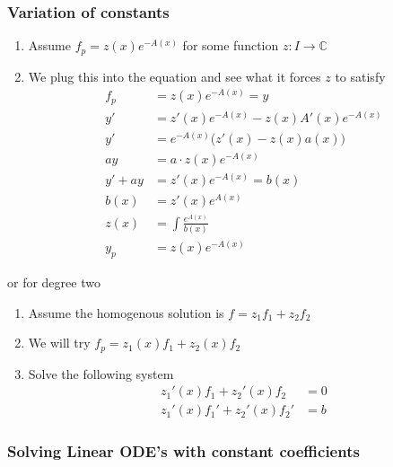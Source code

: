 \documentclass[8pt]{extarticle}
\newcommand{\C}{{\mathbb C}}
\newcommand{\ra}{{\rightarrow}}
\begin{document}
\begin{multicols*}{3}
    \subsubsection {Variation of constants}
  
  \begin{enumerate}[label=(\arabic*)]
    \item Assume $f_p = z(x) e^{-A(x)}$ for some function
          $z: I \ra \C$
    \item We plug this into the equation and see what
          it forces $z$ to satisfy
          \begin{align*}
            f_p     & = z(x) e^{-A(x)} = y                      \\
            y'      & = z'(x) e^{-A(x)} - z(x) A'(x) e^{-A(x)}  \\
            y'      & = e^{-A(x)} \Big (z'(x) - z(x) a(x)\Big ) \\
            ay      & = a \cdot z(x) e^{-A(x)}                  \\
            y' + ay & = z'(x) e^{-A(x)} = b(x)                  \\
            b(x)    & = z'(x) e^{A(x)}                          \\
            z(x)    & = \int \frac{e^{A(x)}}{b(x)}              \\
            y_p     & = z(x) e^{-A(x)}
          \end{align*}
  \end{enumerate}
  or for degree two
  \begin{enumerate}[label=(\arabic*)]
    \item Assume the homogenous solution is $f = z_1 f_1 + z_2 f_2$
    \item We will try $f_p = z_1(x) f_1 + z_2(x) f_2$
    \item Solve the following system
          \begin{align*}
            z_1'(x) f_1 + z_2'(x) f_2   & = 0 \\
            z_1'(x) f_1' + z_2'(x) f_2' & = b 
          \end{align*}
  \end{enumerate}

    \subsubsection {Solving Linear ODE's with constant coefficients}
  

\end{multicols*}
\end{document}
